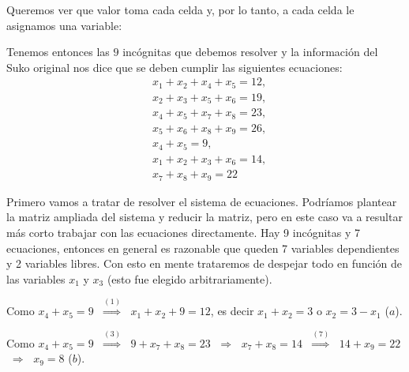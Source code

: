 \begin{enumerate}[topsep=6pt, itemsep=.4cm]
\rta Queremos ver que valor toma cada celda y, por lo tanto,  a cada celda le asignamos una variable:
\begin{center}
\end{center}
Tenemos entonces las $9$ incógnitas que debemos resolver y la información del Suko original nos dice que se deben cumplir las siguientes ecuaciones:
\begin{align}
&x_1 + x_2 +x_4 +x_5 =12,  \\
&x_2+ x_3+x_5 +x_6 = 19, \\
&x_4 +x_5 +x_7 + x_8 = 23, \\
&x_5 +x_6 +x_8 + x_9 = 26, \\
&x_4 + x_5 = 9, \\
&x_1+x_2 +x_3 +x_6 = 14, \\
&x_7+ x_8 + x_9 = 22
\end{align}


Primero vamos a tratar de resolver el sistema de ecuaciones. Podríamos plantear  la matriz ampliada del sistema y  reducir la matriz, pero en este caso va a resultar más corto trabajar con las ecuaciones directamente. Hay 9 incógnitas y 7 ecuaciones, entonces en general es razonable que queden 7 variables dependientes y 2 variables libres. Con esto en mente trataremos de despejar todo en función de las variables $x_1$ y $x_3$ (esto fue elegido arbitrariamente). 


Como $x_4 + x_5 = 9$ $\;\stackrel{(1)}{\Rightarrow}\;$ $x_1 + x_2 + 9 =12$,  es decir $x_1 + x_2  =3$ o \colorbox{green!20}{$x_2 = 3 -x_1$ ($a$)}.


Como $x_4 + x_5 = 9$ 
$\;\stackrel{(3)}{\Rightarrow}\;$ 
$9+x_7 + x_8 = 23$ 
$\;\stackrel{}{\Rightarrow}\;$
$x_7 + x_8 = 14$ 
$\;\stackrel{(7)}{\Rightarrow}\;$
$14 + x_9 = 22$ $\;\stackrel{}{\Rightarrow}\;$ \colorbox{green!20}{$x_9 = 8$ ($b$)}.


\end{enumerate}
